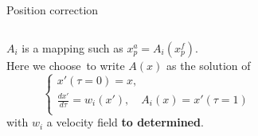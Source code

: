 \documentclass[aspectratio=169]{beamer} %
\begin{document}
\begin{frame}{Position correction}
    \begin{columns}[t]
        \begin{column}{0.6\textwidth}
            $A_i$ is a mapping such as $x^a_{p} = A_i(x^f_{p})$. \\
            Here we choose~\footnotemark[1] to write $A(x)$ as the solution of\\
            \begin{equation*}
                \begin{cases}
                    x'(\tau = 0) = x,                                           \\
                    \frac{d x'}{d \tau} = w_i (x'), \quad A_i(x) = x'(\tau = 1) \\
                \end{cases}
            \end{equation*}with $w_i$ a velocity field \textbf{to determined}.
        \end{column}
        \begin{column}{0.4\textwidth}
            \vspace{-2cm}
            \begin{figure}
                \centering

\end{figure}
\end{column}
\end{columns}
\end{frame}
\end{document}
